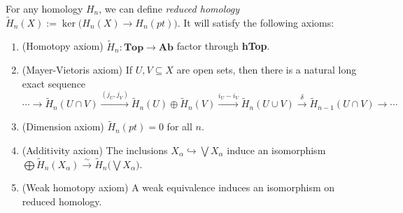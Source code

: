 \documentclass[12pt]{article}
\theoremstyle{plain}
\theoremstyle{definition}
\theoremstyle{remark}
\renewcommand{\H}{\widetilde H}
\begin{document}
 For any homology $H_n$, we can define \emph{reduced homology} $\H_n(X) := \ker \bigl(
 H_n(X)\to H_n(pt)\bigr)$. It will satisfy the following axioms:
 {\footnotesize
 \begin{enumerate}
   \item (Homotopy axiom) $\H_n:\textbf{Top}\to \textbf{Ab}$ factor through
   \textbf{hTop}.
   \item (Mayer-Vietoris axiom) If $U, V\subseteq X$ are open sets, then there is a
   natural long exact sequence
   \[
    \cdots \to \H_n(U\cap V)\xrightarrow{(j_U,j_V)} \H_n(U)\oplus
    \H_n(V)\xrightarrow{i_U-i_V} \H_n(U\cup V)\xrightarrow{\ \delta\ }\H_{n-1}(U\cap
    V) \to \cdots
   \]
   \item (Dimension axiom) $\H_n(pt)=0$ for all $n$.
   \item (Additivity axiom) The inclusions $X_\alpha\hookrightarrow \bigvee X_\alpha$
       induce an isomorphism $\bigoplus \H_n(X_\alpha)\xrightarrow{\sim}\H_n\bigl(\bigvee
       X_\alpha\bigr)$.
   \item (Weak homotopy axiom) A weak equivalence induces an isomorphism on reduced homology.
 \end{enumerate}}
\end{document}
